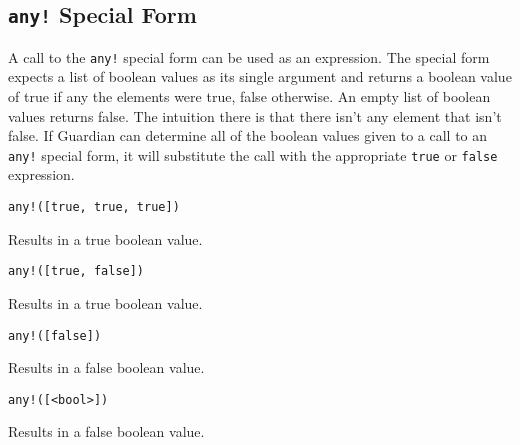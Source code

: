
\subsection{\texttt{any!} Special Form}
{
	A call to the \texttt{any!} special form can be used as an expression.
	The special form expects a list of boolean values as its
	single argument and returns a boolean value of true if any the elements
	were true, false otherwise. An empty list of boolean values returns false.
	The intuition there is that there isn't any element that isn't false.
	If Guardian can determine all of the boolean values given to a call to an
	\texttt{any!} special form, it will substitute the call with the
	appropriate \texttt{true} or \texttt{false} expression.
	
	\begin{itemize}
	{
		\item \texttt{any!([true, true, true])}
		
			Results in a true boolean value.
		
		\item \texttt{any!([true, false])}
		
			Results in a true boolean value.
		
		\item \texttt{any!([false])}
		
			Results in a false boolean value.
		
		\item \texttt{any!([<bool>])}
		
			Results in a false boolean value.
	}
	\end{itemize}
}
